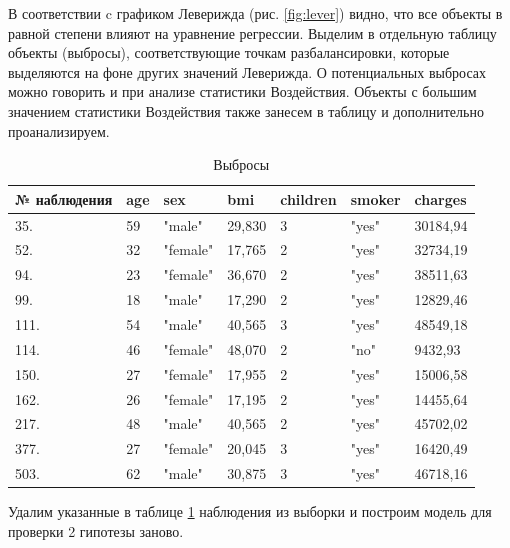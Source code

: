 \documentclass[a4paper,12pt]{article}
\begin{document}
В соответствии c графиком Леверижда (рис. \ref{fig:lever}) видно, что все объекты в равной степени влияют на уравнение регрессии. Выделим в отдельную таблицу объекты (выбросы), соответствующие точкам разбалансировки, которые выделяются на фоне других значений Леверижда.
О потенциальных выбросах можно говорить и при анализе статистики Воздействия. Объекты с большим значением статистики Воздействия также занесем в таблицу и дополнительно проанализируем.

\begin{table}[H]
	\begin{center}
	\begin{tabular}{|l|l|l|l|l|l|l|}
		\hline
		№ наблюдения & age & sex      & bmi    & children & smoker & charges  \\ \hline
		35.  & 59  & "male"   & 29,830 & 3        & "yes"  & 30184,94 \\ \hline
		52.  & 32  & "female" & 17,765 & 2        & "yes"  & 32734,19 \\ \hline
		94.  & 23  & "female" & 36,670 & 2        & "yes"  & 38511,63 \\ \hline
		99.  & 18  & "male"   & 17,290 & 2        & "yes"  & 12829,46 \\ \hline
		111.  & 54  & "male"   & 40,565 & 3        & "yes"  & 48549,18 \\ \hline
		114.  & 46  & "female" & 48,070 & 2        & "no"   & 9432,93  \\ \hline
		150.  & 27  & "female" & 17,955 & 2        & "yes"  & 15006,58 \\ \hline
		162.  & 26  & "female" & 17,195 & 2        & "yes"  & 14455,64 \\ \hline
		217.  & 48  & "male"   & 40,565 & 2        & "yes"  & 45702,02 \\ \hline
		377. & 27  & "female" & 20,045 & 3        & "yes"  & 16420,49 \\ \hline
		503. & 62  & "male"   & 30,875 & 3        & "yes"  & 46718,16 \\ \hline
	\end{tabular}
\caption{Выбросы}
\label{tab:out}
	\end{center}
\end{table}

Удалим указанные в таблице \ref{tab:out} наблюдения из выборки и построим модель для проверки 2 гипотезы заново.
\end{document}
